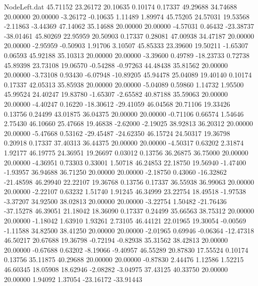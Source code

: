 \begin{filecontents}{NodeLeft.dat}
  45.71152   23.26172   20.10635     0.10174    0.17337   49.29688   34.74688   20.00000   20.00000   -3.26172   -0.10635    1.11489    1.89974
  45.75205   24.57031   19.53568    -2.11863   -3.44369   47.14062   35.14688   20.00000   20.00000   -4.57031    0.46432  -23.38737  -38.01461
  45.80269   22.95959   20.50903     0.17337    0.28081   47.00938   34.47187   20.00000   20.00000   -2.95959   -0.50903    1.91706    3.10507
  45.85333   23.39600   19.50211    -1.65307    0.06593   45.92188   35.10313   20.00000   20.00000   -3.39600    0.49789  -18.23733    0.72738
  45.89398   23.73108   19.06570    -0.54288   -0.97263   44.48438   35.81562   20.00000   20.00000   -3.73108    0.93430   -6.07948  -10.89205
  45.94478   25.04089   19.40140     0.10174    0.17337   42.05313   35.85938   20.00000   20.00000   -5.04089    0.59860    1.14732    1.95500
  45.99524   24.40247   19.83780    -1.65307   -2.65582   40.87188   35.59063   20.00000   20.00000   -4.40247    0.16220  -18.30612  -29.41059
  46.04568   20.71106   19.33426     0.13756    0.24499   43.01875   36.04375   20.00000   20.00000   -0.71106    0.66574    1.54646    2.75430
  46.10660   25.47668   19.46838    -2.62000   -2.19025   38.92813   36.20312   20.00000   20.00000   -5.47668    0.53162  -29.45487  -24.62350
  46.15724   24.50317   19.36798     0.20918    0.17337   37.40313   36.44375   20.00000   20.00000   -4.50317    0.63202    2.31874    1.92177
  46.19775   24.36951   19.26697     0.03012    0.13756   36.26875   36.75000   20.00000   20.00000   -4.36951    0.73303    0.33001    1.50718
  46.24853   22.18750   19.56940    -1.47400   -1.93957   36.94688   36.71250   20.00000   20.00000   -2.18750    0.43060  -16.32862  -21.48598
  46.29940   22.22107   19.36768     0.13756    0.17337   36.55938   36.99063   20.00000   20.00000   -2.22107    0.63232    1.51740    1.91245
  46.34999   23.22754   18.49518    -1.97538   -3.37207   34.92500   38.02813   20.00000   20.00000   -3.22754    1.50482  -21.76436  -37.15278
  46.39051   21.18042   18.36090     0.17337    0.24499   35.66563   38.75312   20.00000   20.00000   -1.18042    1.63910    1.93261    2.73105
  46.44121   22.01965   19.30054    -0.00569   -1.11588   34.82500   38.41250   20.00000   20.00000   -2.01965    0.69946   -0.06364  -12.47318
  46.50217   20.67688   19.36798    -0.72194   -0.82938   35.31562   38.42813   20.00000   20.00000   -0.67688    0.63202   -8.19066   -9.40957
  46.55289   20.87830   17.55524     0.10174    0.13756   35.11875   40.29688   20.00000   20.00000   -0.87830    2.44476    1.12586    1.52215
  46.60345   18.05908   18.62946    -2.08282   -3.04975   37.43125   40.33750   20.00000   20.00000    1.94092    1.37054  -23.16172  -33.91443

\end{filecontents}
